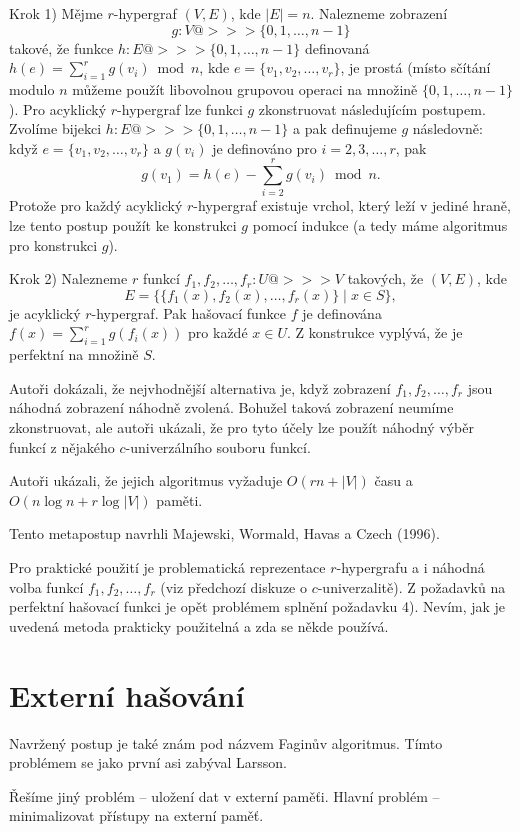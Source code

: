 \documentclass[a4paper,12pt]{article}
\begin{document}
Krok 1) Mějme $r$-hypergraf $(V,E)$, kde $|E|=n$.  Nalezneme 
zobrazení 
$$g:V@>>>\{0,1,\dots,n-1\}$$
takové, že funkce 
$h:E@>>>\{0,1,\dots,n-1\}$ definovaná $h(e)=\sum_{i=1}^rg(v_i)\bmod 
n$, 
kde $e=\{v_1,v_2,\dots,v_r\}$, je prostá (místo sčítání modulo $
n$ 
můžeme použít libovolnou grupovou operaci na 
množině $\{0,1,\dots,n-1\}$).  Pro acyklický $r$-hypergraf lze 
funkci $g$ zkonstruovat násle\-dujícím postupem.  Zvolíme 
bijekci $h:E@>>>\{0,1,\dots,n-1\}$ a pak definujeme $g$ 
následovně:  když $e=\{v_1,v_2,\dots,v_r\}$ a $g(v_i)$ je 
definováno pro $i=2,3,\dots,r$, pak 
$$g(v_1)=h(e)-\sum_{i=2}^rg(v_i)\bmod n.$$
Protože pro každý acyklický $r$-hypergraf existuje vrchol, který 
leží v jediné hraně, lze tento postup použít ke konstrukci $
g$ 
pomocí indukce (a tedy máme algoritmus pro konstrukci $g$).  

Krok 2) Nalezneme $r$ funkcí $f_1,f_2,\dots,f_r:U@>>>
V$ takových, že 
$(V,E)$, kde 
$$E=\{\{f_1(x),f_2(x),\dots,f_r(x)\}\mid x\in S\},$$
 je acyklický 
$r$-hypergraf.  Pak hašovací funkce $f$ je definována 
$f(x)=\sum_{i=1}^rg(f_i(x))$ pro každé $x\in U$.  Z konstrukce 
vyplývá, že je perfektní na množině $S$.  

Autoři dokázali, že 
nejvhodnější alternativa je, když zobrazení $f_1
,f_2,\dots,f_r$ 
jsou náhodná zob\-razení náhodně zvolená. Bohu\-žel taková 
zobrazení neumíme zkonstruovat, ale autoři ukázali, že 
pro tyto účely lze použít náhodný výběr funkcí z 
nějakého $c$-univerzálního souboru funk\-cí. 

Autoři ukázali, že jejich algoritmus vyžaduje $
O(rn+|V|)$ 
času a $O(n\log n+r\log|V|)$ paměti. 

Tento metapostup navrhli Majewski, Wormald, Havas a Czech (1996).

Pro praktické použití je problematická 
reprezentace $r$-hyper\-gra\-fu a i náhodná volba funkcí 
$f_1,f_2,\dots,f_r$ (viz předchozí diskuze o $c$-univerzalitě).  Z 
požadavků na perfektní hašovací funkci je opět 
problémem splnění poža\-davku 4).  Nevím, jak je uvedená 
metoda prakticky pou\-ži\-telná a zda se někde používá.  

\section{Externí hašování}

Navržený postup je také znám pod názvem Faginův algoritmus. Tímto problémem se jako první asi zabýval Larsson.

Řešíme jiný problém -- uložení dat v externí 
pamě\v ti. Hlavní problém -- minimalizovat přístupy na 
externí pamě\v t. 
\end{document}
